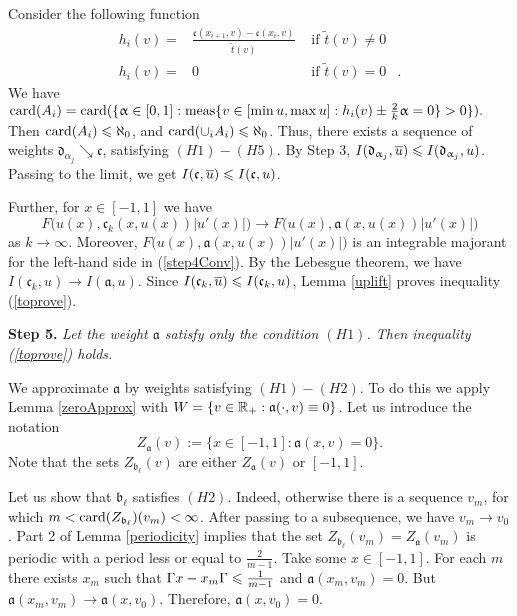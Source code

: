 Consider the following function
$$
\begin{aligned}
h_i(v) = & \frac{\mathfrak c(x_{i + 1}, v) - \mathfrak c(x_i, v)}{\tilde{t} (v)} & \text{ if } \tilde{t} (v) \neq 0 & \\
h_i(v) = & 0 & \text{ if } \tilde{t} (v) = 0 &.
\end{aligned}
$$
We have $\card(A_i) = \card(\{ \alpha \in [0, 1]: \meas \{ v \in [\min u, \max u]: h_i(v) \pm \frac{2}{k} \alpha = 0 \} > 0 \}).$
Then $\operatorname{card}(A_i) \leqslant \aleph_0$, and $\operatorname{card}(\cup_i A_i) \leqslant \aleph_0$.
Thus, there exists a sequence of weights $\mathfrak d_{\alpha_j} \searrow \mathfrak c$, satisfying $(H1)-(H5)$.
By Step 3, $I(\mathfrak d_{\alpha_j}, \mon{u}) \le I(\mathfrak d_{\alpha_j}, u)$.
Passing to the limit, we get $I(\mathfrak c, \mon{u}) \le I(\mathfrak c, u)$.

Further, for $x \in [-1, 1]$ we have
\begin{equation}
\label{step4Conv}
F\big(u(x), \mathfrak c_k(x, u(x)) |u'(x)|\big) \to F\big(u(x), \mathfrak a(x, u(x)) |u'(x)|\big)
\end{equation}
as $k \to \infty$.
Moreover, $F\big(u(x), \mathfrak a(x, u(x)) |u'(x)|\big)$ is an integrable majorant
for the left-hand side in (\ref{step4Conv}).
By the Lebesgue theorem, we have $I(\mathfrak c_k, u) \to I(\mathfrak a, u)$.
Since $I(\mathfrak c_k, \mon{u}) \le I(\mathfrak c_k, u)$, Lemma \ref{uplift} proves inequality (\ref{toprove}).

\bigskip
\textbf{Step 5.} \textit{Let the weight $\mathfrak a$ satisfy only the condition $(H1)$.
Then inequality (\ref{toprove}) holds.}

We approximate $\mathfrak a$ by weights satisfying $(H1)-(H2)$.
To do this we apply Lemma \ref{zeroApprox} with $W = \{ v \in \mathbb R_+: \mathfrak a(\cdot, v) \equiv 0 \}$.
Let us introduce the notation $$Z_{\mathfrak a}(v) := \{ x \in [-1, 1]: \mathfrak a(x, v) = 0 \}.$$
Note that the sets $Z_{\mathfrak b_{\ell}}(v)$ are either $Z_{\mathfrak a}(v)$ or $[-1, 1]$.

Let us show that $\mathfrak b_{\ell}$ satisfies $(H2)$.
Indeed, otherwise there is a sequence $v_m$, for which
$m < \operatorname{card}(Z_{\mathfrak b_{\ell}})(v_m) < \infty$.
After passing to a subsequence, we have $v_m \to v_0$.
Part 2 of Lemma \ref{periodicity} implies that the set $Z_{\mathfrak b_{\ell}}(v_m) = Z_{\mathfrak a}(v_m)$
is periodic with a period less or equal to $\frac{2}{m - 1}$.
Take some $x \in [-1, 1]$. For each $m$ there exists $x_m$ such that
$\abs{x - x_m} \le \frac{1}{m - 1}$ and $\mathfrak a(x_m, v_m) = 0$.
But $\mathfrak a(x_m, v_m) \to \mathfrak a(x, v_0)$.
Therefore, $\mathfrak a(x, v_0) = 0$.

